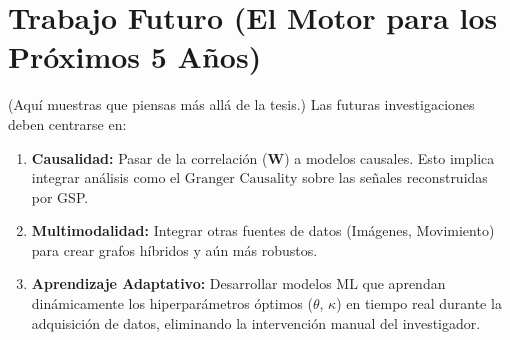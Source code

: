 \documentclass[a4paper, 12pt]{book}
\begin{document}
\section{Trabajo Futuro (El Motor para los Próximos 5 Años)}
(Aquí muestras que piensas más allá de la tesis.)
Las futuras investigaciones deben centrarse en:
\begin{enumerate}
    \item \textbf{Causalidad:} Pasar de la correlación ($\mathbf{W}$) a modelos causales. Esto implica integrar análisis como el $\text{Granger Causality}$ sobre las señales reconstruidas por GSP.
    \item \textbf{Multimodalidad:} Integrar otras fuentes de datos (Imágenes, Movimiento) para crear grafos híbridos y aún más robustos.
    \item \textbf{Aprendizaje Adaptativo:} Desarrollar modelos $\text{ML}$ que aprendan dinámicamente los hiperparámetros óptimos ($\theta$, $\kappa$) en tiempo real durante la adquisición de datos, eliminando la intervención manual del investigador.
\end{enumerate}
\end{document}
